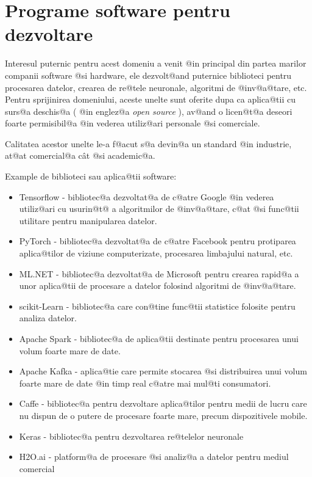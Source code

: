 \section{Programe software pentru dezvoltare}

Interesul puternic pentru acest domeniu a venit @in principal din partea marilor companii software @si hardware, ele dezvolt@and puternice biblioteci pentru procesarea datelor, crearea de re@tele neuronale, algoritmi de @inv@a@tare, etc. Pentru sprijinirea domeniului, aceste unelte sunt oferite dupa ca aplica@tii cu surs@a deschis@a ( @in englez@a {\sl open source} ), av@and o licen@t@a deseori foarte permisibil@a @in vederea utiliz@ari personale @si comerciale.

Calitatea acestor unelte le-a f@acut s@a devin@a un standard @in industrie, at@at comercial@a c\^ at @si academic@a.

Example de biblioteci sau aplica@tii software:

\begin{itemize}
	\item Tensorflow - bibliotec@a dezvoltat@a de c@atre Google @in vederea utiliz@ari cu usurin@t@ a algoritmilor de @inv@a@tare, c@at @si func@tii utilitare pentru manipularea datelor.
	\item PyTorch - bibliotec@a dezvoltat@a de c@atre Facebook pentru protiparea aplica@tilor de viziune computerizate, procesarea limbajului natural, etc.
	\item ML.NET - bibliotec@a dezvoltat@a de Microsoft pentru crearea rapid@a a unor aplica@tii de procesare a datelor folosind algoritmi de @inv@a@tare.
	\item scikit-Learn - bibliotec@a care con@tine func@tii statistice folosite pentru analiza datelor.
	\item Apache Spark - bibliotec@a de aplica@tii destinate pentru procesarea unui volum foarte mare de date.
	\item Apache Kafka - aplica@tie care permite stocarea @si distribuirea unui volum foarte mare de date @in timp real c@atre mai mul@ti consumatori.
	\item Caffe - bibliotec@a pentru dezvoltare aplica@tilor pentru medii de lucru care nu dispun de o putere de procesare foarte mare, precum dispozitivele mobile.
	\item Keras - bibliotec@a pentru dezvoltarea re@telelor neuronale
	\item H2O.ai - platform@a de procesare @si analiz@a a datelor pentru mediul comercial
	
\end{itemize}

